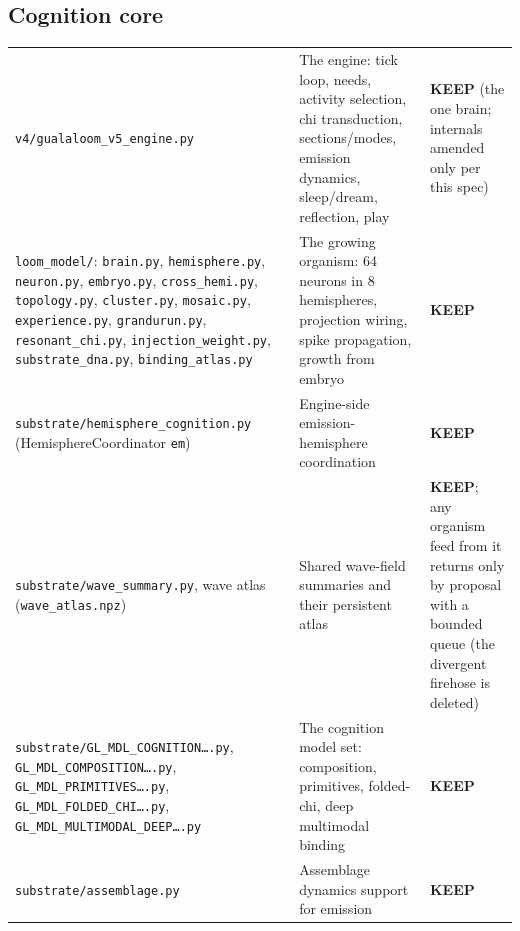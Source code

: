 \documentclass[11pt]{article}
\newcommand{\keep}{\textbf{KEEP}}
\begin{document}
\subsection{Cognition core}
\begin{longtable}{p{} p{} p{}}
\toprule
\texttt{v4/gualaloom\_v5\_engine.py} &
The engine: tick loop, needs, activity selection, chi transduction,
sections/modes, emission dynamics, sleep/dream, reflection, play &
\keep{} (the one brain; internals amended only per this spec) \\
\texttt{loom\_model/}: \texttt{brain.py}, \texttt{hemisphere.py},
\texttt{neuron.py}, \texttt{embryo.py}, \texttt{cross\_hemi.py},
\texttt{topology.py}, \texttt{cluster.py}, \texttt{mosaic.py},
\texttt{experience.py}, \texttt{grandurun.py}, \texttt{resonant\_chi.py},
\texttt{injection\_weight.py}, \texttt{substrate\_dna.py},
\texttt{binding\_atlas.py} &
The growing organism: 64 neurons in 8 hemispheres, projection wiring,
spike propagation, growth from embryo &
\keep{} \\
\texttt{substrate/hemisphere\_cognition.py} (HemisphereCoordinator
\texttt{em}) &
Engine-side emission-hemisphere coordination &
\keep{} \\
\texttt{substrate/wave\_summary.py}, wave atlas (\texttt{wave\_atlas.npz}) &
Shared wave-field summaries and their persistent atlas &
\keep{}; any organism feed from it returns only by proposal with a bounded
queue (the divergent firehose is deleted) \\
\texttt{substrate/GL\_MDL\_COGNITION\ldots.py},
\texttt{GL\_MDL\_COMPOSITION\ldots.py},
\texttt{GL\_MDL\_PRIMITIVES\ldots.py},
\texttt{GL\_MDL\_FOLDED\_CHI\ldots.py},
\texttt{GL\_MDL\_MULTIMODAL\_DEEP\ldots.py} &
The cognition model set: composition, primitives, folded-chi, deep
multimodal binding &
\keep{} \\
\texttt{substrate/assemblage.py} &
Assemblage dynamics support for emission &
\keep{} \\
\bottomrule
\end{longtable}
\end{document}
